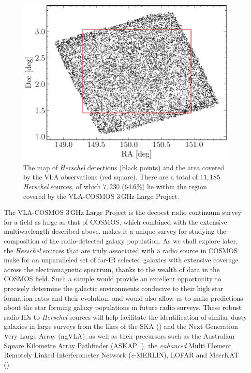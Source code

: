 \begin{figure}
	\centering
	\includegraphics[width=0.8\columnwidth]{Figures/sky_map.pdf}
	\caption[Map of the \textit{Herschel} and VLA observations in the COSMOS field]{The map of \textit{Herschel} detections (black points) and the area covered by the VLA observations (red square). There are a total of $11,185$ \textit{Herschel} sources, of which $7,230$ ($64.6$\%) lie within the region covered by the VLA-COSMOS $3\,$GHz Large Project.}
	\label{fig:sky_map}
\end{figure}

The VLA-COSMOS $3\,$GHz Large Project is the deepest radio continuum survey for a field as large as that of COSMOS, which combined with the extensive multiwavlength described above, makes it a unique survey for studying the composition of the radio-detected galaxy population. As we shall explore later, the \textit{Herschel} sources that are truly associated with a radio source in COSMOS make for an unparalleled set of far-IR selected galaxies with extensive coverage across the electromagnetic spectrum, thanks to the wealth of data in the COSMOS field. Such a sample would provide an excellent opportunity to precisely determine the galactic environments conducive to their high star formation rates and their evolution, and would also allow us to make predictions about the star forming galaxy populations in future radio surveys. These robust radio IDs to \textit{Herschel} sources will help facilitate the identification of similar dusty galaxies in large surveys from the likes of the SKA (\citealt{Dewdney_2009}) and the Next Generation Very Large Array (ngVLA), as well as their precursors such as the Australian Square Kilometre Array Pathfinder (ASKAP: \citealt{Johnston_2007}), the \textit{enhanced} Multi Element Remotely Linked Interferometer Network (\textit{e}-MERLIN), LOFAR and MeerKAT (\citealt{Jonas_2009}).

